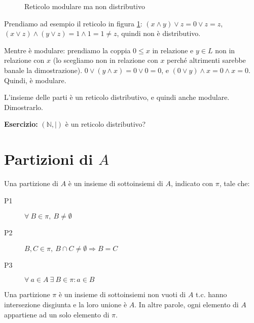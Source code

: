 \begin{figure}[ht]
\centering
{}
\caption{\label{fig:mod_not_distr}Reticolo modulare ma non distributivo}
\end{figure}
Prendiamo ad esempio il reticolo in figura \ref{fig:mod_not_distr}: $(x \wedge y) \vee z = 0 \vee z = z$, $(x \vee z) \wedge (y \vee z) = 1 \wedge 1 = 1 \neq z$, quindi non \`e distributivo. 

Mentre \`e modulare: prendiamo la coppia $0 \le x$ in relazione e $y \in L$ non in relazione con $x$ (lo scegliamo non in relazione con $x$ perch\'e altrimenti sarebbe banale la dimostrazione). $ 0 \vee (y \wedge x) = 0 \vee 0 = 0$, e $(0 \vee y) \wedge x = 0 \wedge x = 0$. Quindi, \`e modulare.

L'insieme delle parti \`e un reticolo distributivo, e quindi anche modulare. Dimostrarlo.

\vspace{5cm}

\textbf{Esercizio:} $(\mathbb{N}, |)$ \`e un reticolo distributivo?

\vspace{5cm}

\section{Partizioni di $A$}

\begin{defn}[Partizione]\label{partizione}
Una partizione di $A$ \`e un insieme di sottoinsiemi di $A$, indicato con $\pi$, tale che:
\begin{description}
  \item[P1\label{itm:P1}] $\forall \ B \in \pi , \ B \neq \emptyset$
  \item[P2\label{itm:P2}] $B, C \in \pi , \ B \cap C \neq \emptyset \Rightarrow B = C$
  \item[P3\label{itm:P3}] $\forall \ a \in A \ \exists \ B \in \pi : a \in B$
\end{description}
\end{defn}
Una partizione $\pi$ \`e un insieme di sottoinsiemi non vuoti di $A$ t.c. hanno intersezione disgiunta e la loro unione \`e $A$. In altre parole, ogni elemento di $A$ appartiene ad un solo elemento di $\pi$.

